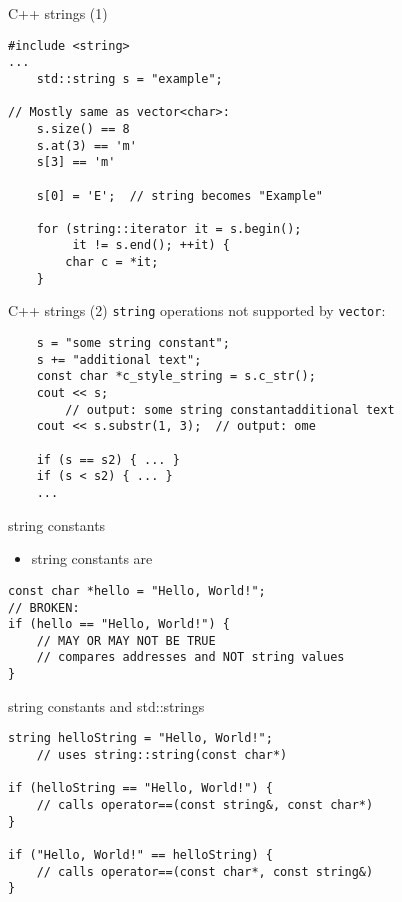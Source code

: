 \begin{frame}[fragile,label=cppStr]{C++ strings (1)}
\lstset{
    language=C++,
    style=small
}
\begin{lstlisting}
#include <string>
...
    std::string s = "example";

// Mostly same as vector<char>:
    s.size() == 8
    s.at(3) == 'm'
    s[3] == 'm'

    s[0] = 'E';  // string becomes "Example"

    for (string::iterator it = s.begin();
         it != s.end(); ++it) {
        char c = *it;
    }
\end{lstlisting}
\end{frame}

\begin{frame}[fragile,label=cppStrAddtl]{C++ strings (2)}
\lstset{
    language=C++,
    style=small
}
\texttt{string} operations not supported by {\tt vector}:
\begin{lstlisting}
    s = "some string constant";
    s += "additional text";
    const char *c_style_string = s.c_str();
    cout << s;
        // output: some string constantadditional text
    cout << s.substr(1, 3);  // output: ome

    if (s == s2) { ... }
    if (s < s2) { ... }
    ...
\end{lstlisting}
\end{frame}

\begin{frame}[fragile,label=strConstants]{string constants}
\lstset{
    language=C++,
    style=small
}
    \begin{itemize}
        \item string constants are 
    \end{itemize}
\begin{lstlisting}
const char *hello = "Hello, World!";
// BROKEN:
if (hello == "Hello, World!") {
    // MAY OR MAY NOT BE TRUE
    // compares addresses and NOT string values
}
\end{lstlisting}
\end{frame}

\begin{frame}[fragile,label=strConstAndStdStr]{string constants and std::strings}
\lstset{
    language=C++,
    style=small
}
\begin{lstlisting}
string helloString = "Hello, World!";
    // uses string::string(const char*)

if (helloString == "Hello, World!") {
    // calls operator==(const string&, const char*)
}

if ("Hello, World!" == helloString) {
    // calls operator==(const char*, const string&)
}
\end{lstlisting}
\end{frame}
